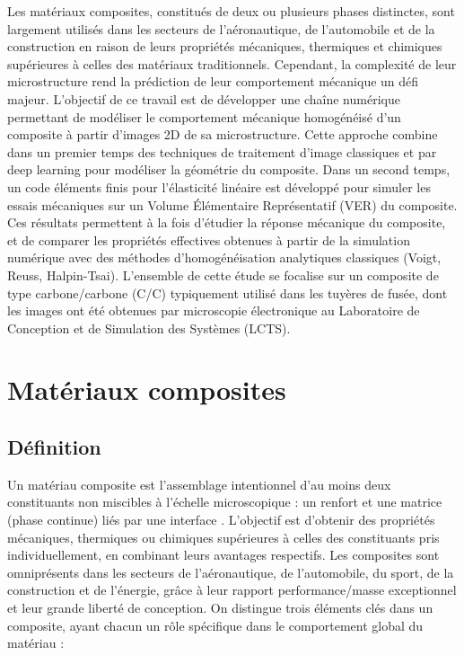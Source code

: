 \documentclass[a4paper,11pt]{article}
\begin{document}
Les matériaux composites, constitués de deux ou plusieurs phases distinctes, sont largement utilisés dans les secteurs de l'aéronautique, de l'automobile et de la construction en raison de leurs propriétés mécaniques, thermiques et chimiques supérieures à celles des matériaux traditionnels. Cependant, la complexité de leur microstructure rend la prédiction de leur comportement mécanique un défi majeur. L'objectif de ce travail est de développer une chaîne numérique permettant de modéliser le comportement mécanique homogénéisé d'un composite à partir d'images 2D de sa microstructure. Cette approche combine dans un premier temps des techniques de traitement d'image classiques et par deep learning pour modéliser la géométrie du composite. Dans un second temps, un code éléments finis pour l'élasticité linéaire est développé pour simuler les essais mécaniques sur un Volume Élémentaire Représentatif (VER) du composite. Ces résultats permettent à la fois d'étudier la réponse mécanique du composite, et de comparer les propriétés effectives obtenues à partir de la simulation numérique avec des méthodes d'homogénéisation analytiques classiques (Voigt, Reuss, Halpin-Tsai). L'ensemble de cette étude se focalise sur un composite de type carbone/carbone (C/C) typiquement utilisé dans les tuyères de fusée, dont les images ont été obtenues par microscopie électronique au Laboratoire de Conception et de Simulation des Systèmes (LCTS).
\section{Matériaux composites}

\subsection{Définition}

Un matériau composite est l'assemblage intentionnel d'au moins deux constituants non miscibles à l'échelle microscopique : un renfort  et une matrice (phase continue) liés par une interface \cite{Gornet2008}. L'objectif est d'obtenir des propriétés mécaniques, thermiques ou chimiques supérieures à celles des constituants pris individuellement, en combinant leurs avantages respectifs. Les composites sont omniprésents dans les secteurs de l'aéronautique, de l'automobile, du sport, de la construction et de l'énergie, grâce à leur rapport performance/masse exceptionnel et leur grande liberté de conception. On distingue trois éléments clés dans un composite, ayant chacun un rôle spécifique dans le comportement global du matériau :
\end{document}
